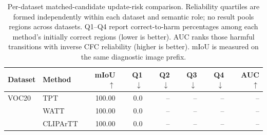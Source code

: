 \begin{table}[t]
\centering
\small
\setlength{\tabcolsep}{4.5pt}
\caption{Per-dataset matched-candidate update-risk comparison. Reliability quartiles are formed independently within each dataset and semantic role; no result pools regions across datasets. Q1--Q4 report correct-to-harm percentages among each method's initially correct regions (lower is better). AUC ranks those harmful transitions with inverse CFC reliability (higher is better). mIoU is measured on the same diagnostic image prefix.}
\label{tab:source-risk-per-dataset}
\begin{tabular}{llrrrrrr}
\toprule
Dataset & Method & mIoU $\uparrow$ & Q1 $\downarrow$ & Q2 $\downarrow$ & Q3 $\downarrow$ & Q4 $\downarrow$ & AUC $\uparrow$ \\
\midrule
VOC20 & TPT & 100.00 & 0.0 & -- & -- & -- & -- \\
 & WATT & 100.00 & 0.0 & -- & -- & -- & -- \\
 & CLIPArTT & 100.00 & 0.0 & -- & -- & -- & -- \\
\bottomrule
\end{tabular}
\end{table}
